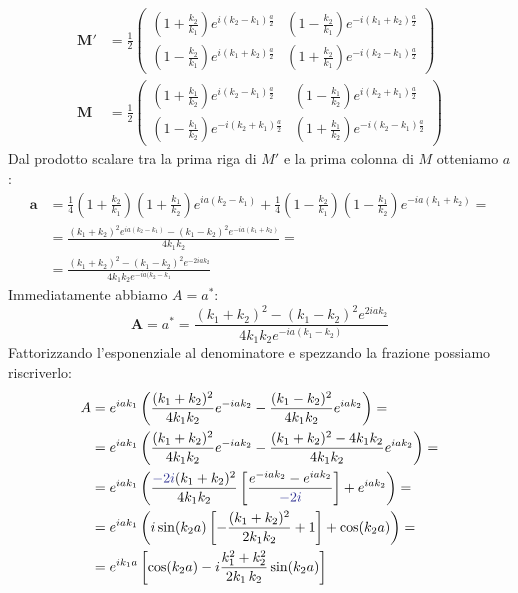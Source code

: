 \documentclass[../../FisicaTeorica.tex]{subfiles}
\begin{document}
\begin{align*}
\bm{M'} &= \frac{1}{2} \begin{pmatrix}
\left(1+\frac{k_2}{k_1}\right) e^{i(k_2-k_1)\frac{a}{2}} & \left(1-\frac{k_2}{k_1}\right)e^{-i(k_1+k_2)\frac{a}{2}}\\
\left(1-\frac{k_2}{k_1}\right)e^{i(k_1+k_2)\frac{a}{2}}&
\left(1+\frac{k_2}{k_1}\right)e^{-i(k_2-k_1)\frac{a}{2}}
\end{pmatrix}
\\
\bm{M}&=\frac{1}{2}\begin{pmatrix}
\left(1+\frac{k_1}{k_2}\right)e^{i(k_2-k_1)\frac{a}{2}} & \left (
1-\frac{k_1}{k_2}
\right)
e^{i(k_2+k_1)\frac{a}{2}}\\
\left(1-\frac{k_1}{k_2}\right)e^{-i(k_2+k_1)\frac{a}{2}} & \left(1+\frac{k_1}{k_2}\right)e^{-i(k_2-k_1)\frac{a}{2}}
\end{pmatrix}
\end{align*} 
Dal prodotto scalare tra la prima riga di $M'$ e la prima colonna di $M$ otteniamo $a$:
\begin{align*}
\bm{a}&=\frac{1}{4}\left(1+\frac{k_2}{k_1}\right)\left(1+\frac{k_1}{k_2}\right)e^{ia(k_2-k_1)}+\frac{1}{4}\left(1-\frac{k_2}{k_1}\right)\left(1-\frac{k_1}{k_2}\right)e^{-ia(k_1+k_2)}=\\
&=\frac{(k_1+k_2)^2 e^{ia(k_2-k_1)}-(k_1-k_2)^2e^{-ia(k_1+k_2)}}{4k_1 k_2} =\\
&=\frac{(k_1+k_2)^2 - (k_1-k_2)^2 e^{-2iak_2}}{4k_1 k_2 e^{-ia(k_2-k_1}}
\end{align*}
Immediatamente abbiamo $A=a^*$:
\[
\bm{A}=a^*=\frac{(k_1+k_2)^2-(k_1-k_2)^2 e^{2iak_2}}{4k_1 k_2 e^{-ia(k_1-k_2)}}
\]
Fattorizzando l'esponenziale al denominatore e spezzando la frazione possiamo riscriverlo:
\begin{align*}
A&=e^{iak_1}\left( \frac{(k_1+k_2)^2}{4k_1 k_2}e^{-iak_2} - \frac{(k_1-k_2)^2}{4k_1 k_2}e^{iak_2}\right) =\\
&=e^{iak_1}\left(\frac{(k_1+k_2)^2}{4k_1 k_2} e^{-iak_2}-\frac{(k_1+k_2)^2-4k_1k_2}{4k_1k_2}e^{iak_2}\right)=\\
&=e^{iak_1}\left(\frac{\textcolor{Blue}{-2i}(k_1+k_2)^2}{4k_1k_2}\left[\frac{e^{-iak_2}-e^{iak_2}}{\textcolor{Blue}{-2i}}\right] + e^{iak_2} \right)=\\
&=e^{iak_1}\left(
i\sin(k_2 a) \left[-\frac{(k_1+k_2)^2}{2k_1 k_2}+1\right] + \cos(k_2 a)\right) =\\
&= e^{ik_1 a}\left[
\cos (k_2 a) -i\frac{k_1^2+k_2^2}{2k_1\,k_2}\sin (k_2 a) \right]
\end{align*}
\end{document}
